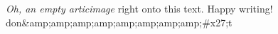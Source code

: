 \textit{Oh, an empty articimage} right onto this text. Happy writing! 
don&amp;amp;amp;amp;amp;amp;amp;amp;#x27;t